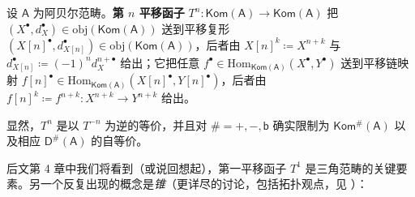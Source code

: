 \begin{Def}\label{translfunc}
	设 $\mathsf{A}$ 为阿贝尔范畴。\textbf{第 $n$ 平移函子} $T^n:\mathsf{Kom(A)}\rightarrow\mathsf{Kom(A)}$ 把 $(X^\bullet, d_X^\bullet)\in\text{obj}(\mathsf{Kom(A)})$ 送到平移复形 $(X[n]^\bullet,d_{X[n]}^\bullet)\in\text{obj}(\mathsf{Kom(A)})$，后者由 $X[n]^k\coloneqq X^{n+k}$ 与 $d_{X[n]}^\bullet\coloneqq(-1)^n d_X^{n+\bullet}$ 给出；它把任意 $f^\bullet\in\text{Hom}_\mathsf{Kom(A)}(X^\bullet,Y^\bullet)$ 送到平移链映射 $f[n]^\bullet\in\text{Hom}_\mathsf{Kom(A)}(X[n]^\bullet,Y[n]^\bullet)$，后者由 $f[n]^k\coloneqq f^{n+k}:X^{n+k}\rightarrow Y^{n+k}$ 给出。
	
	显然，$T^n$ 是以 $T^{-n}$ 为逆的等价，并且对 $\#=+,-,\mathsf{b}$ 确实限制为 $\mathsf{Kom^\#\!(A)}$ 以及相应 $\mathsf{D^\#\!(A)}$ 的自等价。
\end{Def}


后文第 4 章中我们将看到（或说回想起），第一平移函子 $T^1$ 是三角范畴的关键要素。另一个反复出现的概念是\textit{锥}（更详尽的讨论，包括拓扑观点，见 \cite[section 1.5]{[Wei94]}）：

